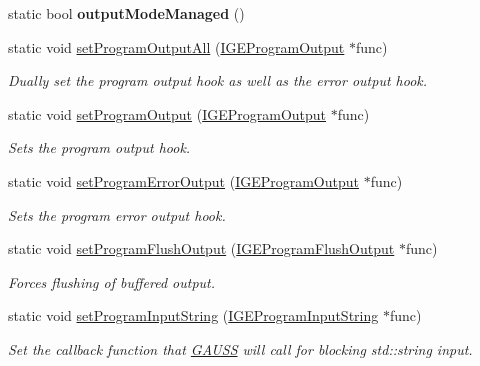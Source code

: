 \begin{DoxyCompactItemize}
\item 
\mbox{\label{class_g_a_u_s_s_a03e56984916b9dedde2811291b81b466}} 
static bool {\bfseries output\+Mode\+Managed} ()
\item 
static void \hyperlink{class_g_a_u_s_s_a0b8379c48d677e05aeab433dba66fbb6}{set\+Program\+Output\+All} (\hyperlink{class_i_g_e_program_output}{I\+G\+E\+Program\+Output} $\ast$func)
\begin{DoxyCompactList}\small\item\em Dually set the program output hook as well as the error output hook. \end{DoxyCompactList}\item 
static void \hyperlink{class_g_a_u_s_s_a7f0dc6b5b307aa06c347f9c6a9fdacab}{set\+Program\+Output} (\hyperlink{class_i_g_e_program_output}{I\+G\+E\+Program\+Output} $\ast$func)
\begin{DoxyCompactList}\small\item\em Sets the program output hook. \end{DoxyCompactList}\item 
static void \hyperlink{class_g_a_u_s_s_abd75266b2c4075da75163fe95b013ef3}{set\+Program\+Error\+Output} (\hyperlink{class_i_g_e_program_output}{I\+G\+E\+Program\+Output} $\ast$func)
\begin{DoxyCompactList}\small\item\em Sets the program error output hook. \end{DoxyCompactList}\item 
static void \hyperlink{class_g_a_u_s_s_a4b7ecb768f49b98110729db7e5728296}{set\+Program\+Flush\+Output} (\hyperlink{class_i_g_e_program_flush_output}{I\+G\+E\+Program\+Flush\+Output} $\ast$func)
\begin{DoxyCompactList}\small\item\em Forces flushing of buffered output. \end{DoxyCompactList}\item 
static void \hyperlink{class_g_a_u_s_s_ae82b5bfdf26971433c46936a812506c3}{set\+Program\+Input\+String} (\hyperlink{class_i_g_e_program_input_string}{I\+G\+E\+Program\+Input\+String} $\ast$func)
\begin{DoxyCompactList}\small\item\em Set the callback function that \hyperlink{class_g_a_u_s_s}{G\+A\+U\+SS} will call for blocking std\+::string input. \end{DoxyCompactList}\item 

\end{DoxyCompactItemize}
